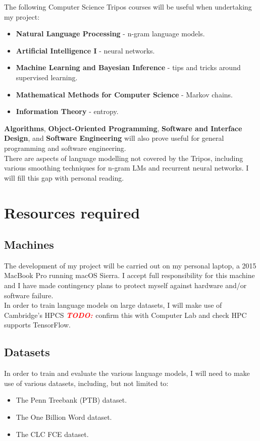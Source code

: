 \documentclass[a4paper, 12pt]{article}
\newcommand{\todo}{\textbf{\textit{\textcolor{red}{TODO: }}}}
\newcommand{\tbf}[1]{\textbf{#1}}
\begin{document}
\noindent
The following Computer Science Tripos courses will be useful when undertaking my project:
\begin{itemize}
\item
	\tbf{Natural Language Processing} - n-gram language models.
\item
	\tbf{Artificial Intelligence I} - neural networks.
\item
	\tbf{Machine Learning and Bayesian Inference} - tips and tricks around supervised learning.
\item
	\tbf{Mathematical Methods for Computer Science} - Markov chains.
\item
	\tbf{Information Theory} - entropy.
\end{itemize}
\tbf{Algorithms}, \tbf{Object-Oriented Programming}, \tbf{Software and Interface Design}, and \tbf{Software Engineering} will also prove useful for general programming and software engineering. \\

\noindent
There are aspects of language modelling not covered by the Tripos, including various smoothing techniques for n-gram LMs and recurrent neural networks. I will fill this gap with personal reading.


\section*{Resources required}

\subsection*{Machines}
The development of my project will be carried out on my personal laptop, a 2015 MacBook Pro running macOS Sierra. I accept full responsibility for this machine and I have made contingency plans to protect myself against hardware and/or software failure. \\

\noindent
In order to train language models on large datasets, I will make use of Cambridge's HPCS \todo{confirm this with Computer Lab and check HPC supports TensorFlow.}

\subsection*{Datasets}
In order to train and evaluate the various language models, I will need to make use of various datasets, including, but not limited to:
\begin{itemize}
\item
	The Penn Treebank (PTB) dataset. \cite{PTB}
\item
	The One Billion Word dataset. \cite{1BW}
\item
	The CLC FCE dataset. \cite{CLC}
\end{itemize}
\end{document}
